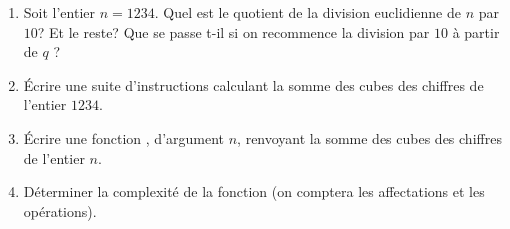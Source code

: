\documentclass[french,11pt,twoside]{VcCours}
\begin{document}
\begin{enumerate}
\item Soit l'entier $n=1234$. Quel est le quotient de la division euclidienne de $n$ par $10$? Et le reste? Que se passe t-il si on recommence la division par $10$ à partir de $q$ ?
\item Écrire une suite d'instructions calculant la somme des cubes des chiffres de l'entier $1234$.
\item Écrire une fonction , d'argument $n$, renvoyant la somme des cubes des chiffres de l'entier $n$.
\item Déterminer la complexité de la fonction  (on comptera les affectations et les opérations).
\end{enumerate}
\end{document}
